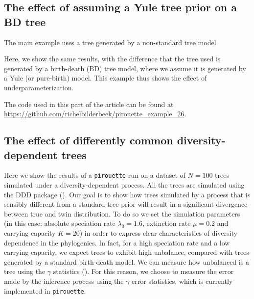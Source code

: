 \subsection{The effect of assuming a Yule tree prior on a BD tree}
\label{subsec:under_parameterization}

  
The main example uses a tree generated by a non-standard tree model.

Here, we show the same results, with the difference that
the tree used is generated by a birth-death (BD) tree model,
where we assume it is generated by a Yule (or pure-birth) model.
This example thus shows the effect of underparameterization.

The code used in this part of the article can be found at 
\url{https://github.com/richelbilderbeek/pirouette_example_26}.



\subsection{The effect of differently common diversity-dependent trees}
\label{subsec:better_label_needed}


Here we show the results of a \verb;pirouette; run on a dataset 
of $N = 100$  
trees simulated under a diversity-dependent process. 
All the trees are simulated using the DDD package (\cite{DDD}). 
Our goal is to show how trees simulated by a process that is 
sensibly different from a standard tree prior will result in a 
significant divergence between true and twin distribution. 
To do so we set the simulation parameters (in this case: 
absolute speciation rate $\lambda_0 = 1.6$, 
extinction rate $\mu = 0.2$ and carrying capacity $K = 20$) 
in order to express clear characteristics of diversity dependence in the 
phylogenies. In fact, for a high speciation rate and a low carrying capacity, 
we expect trees to exhibit high unbalance, compared with trees generated 
by a standard birth-death model. 
We can measure how unbalanced is a tree using the $\gamma$ 
statistics (\cite{pybus2000testing}). For this reason, we choose to 
measure the error made by the inference process using the $\gamma$ error statistics, 
which is currently implemented in \verb;pirouette;.

